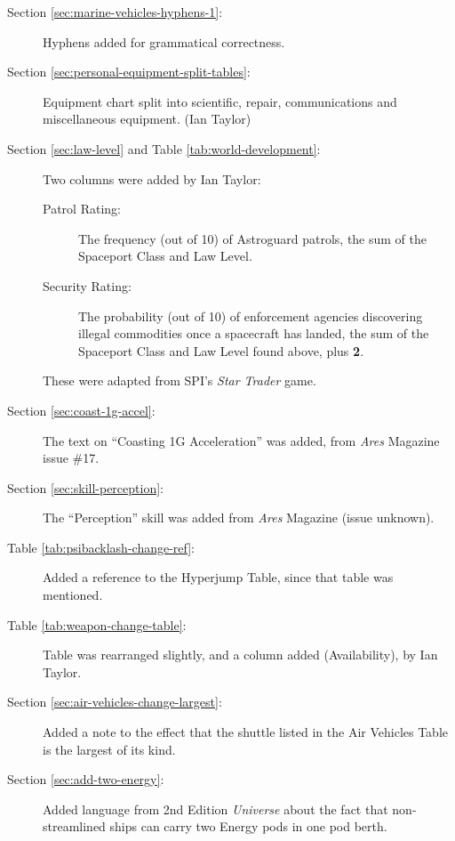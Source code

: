 \begin{description}
\item[Section \ref{sec:marine-vehicles-hyphens-1}:] Hyphens added for
  grammatical correctness.

\item[Section \ref{sec:personal-equipment-split-tables}:] Equipment
chart split into scientific, repair, communications and miscellaneous
equipment.  (Ian Taylor)
\item[Section \ref{sec:law-level} and Table
  \ref{tab:world-development}:] Two columns were added by Ian Taylor:
  \begin{description}
  \item[Patrol Rating:] The frequency (out of 10) of Astroguard
    patrols, the sum of the Spaceport Class and Law Level.
  \item[Security Rating:] The probability (out of 10) of enforcement
    agencies discovering illegal commodities once a spacecraft has
    landed, the sum of the Spaceport Class and Law Level found above,
    plus \textbf{2}.
  \end{description}

  These were adapted from SPI's \emph{Star Trader} game.

\item[Section \ref{sec:coast-1g-accel}:] The text on ``Coasting 1G
  Acceleration'' was added, from \emph{Ares} Magazine issue \#17.


\item[Section \ref{sec:skill-perception}:] The ``Perception'' skill
  was added from \emph{Ares} Magazine (issue unknown).
  

\item[Table \ref{tab:psibacklash-change-ref}:] Added a reference to
  the Hyperjump Table, since that table was mentioned.

\item[Table \ref{tab:weapon-change-table}:] Table was rearranged
  slightly, and a column added (Availability), by Ian Taylor.

\item[Section \ref{sec:air-vehicles-change-largest}:] Added a note to
  the effect that the shuttle listed in 
  the Air Vehicles Table is the largest of its kind. 

\item[Section \ref{sec:add-two-energy}:] Added language from 2nd
  Edition \emph{Universe} about the fact that non-streamlined ships
  can carry two Energy pods in one pod berth.
\end{description}

